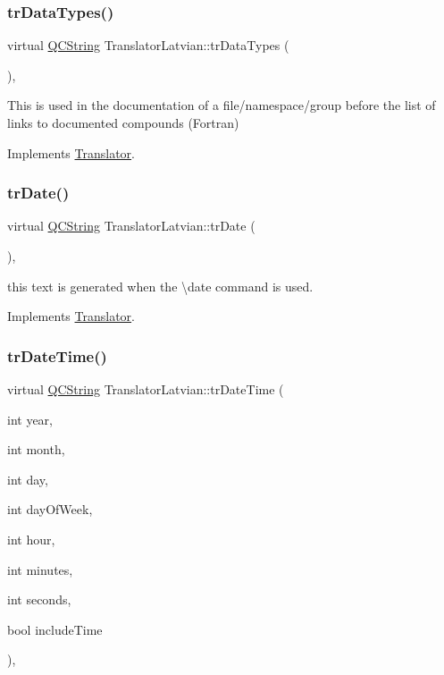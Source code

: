 \subsubsection{\texorpdfstring{trDataTypes()}{trDataTypes()}}
{\footnotesize\ttfamily virtual \mbox{\hyperlink{class_q_c_string}{Q\+C\+String}} Translator\+Latvian\+::tr\+Data\+Types (\begin{DoxyParamCaption}{ }\end{DoxyParamCaption})\hspace{0.3cm}{\ttfamily [inline]}, {\ttfamily [virtual]}}

This is used in the documentation of a file/namespace/group before the list of links to documented compounds (Fortran) 

Implements \mbox{\hyperlink{class_translator}{Translator}}.

\mbox{\label{class_translator_latvian_a0c27033fbc29758948d56b104370738f}} 
\subsubsection{\texorpdfstring{trDate()}{trDate()}}
{\footnotesize\ttfamily virtual \mbox{\hyperlink{class_q_c_string}{Q\+C\+String}} Translator\+Latvian\+::tr\+Date (\begin{DoxyParamCaption}{ }\end{DoxyParamCaption})\hspace{0.3cm}{\ttfamily [inline]}, {\ttfamily [virtual]}}

this text is generated when the \textbackslash{}date command is used. 

Implements \mbox{\hyperlink{class_translator}{Translator}}.

\mbox{\label{class_translator_latvian_a0fdc35505e7beca6f241f31ed3a21f59}} 
\subsubsection{\texorpdfstring{trDateTime()}{trDateTime()}}
{\footnotesize\ttfamily virtual \mbox{\hyperlink{class_q_c_string}{Q\+C\+String}} Translator\+Latvian\+::tr\+Date\+Time (\begin{DoxyParamCaption}\item[{int}]{year,  }\item[{int}]{month,  }\item[{int}]{day,  }\item[{int}]{day\+Of\+Week,  }\item[{int}]{hour,  }\item[{int}]{minutes,  }\item[{int}]{seconds,  }\item[{bool}]{include\+Time }\end{DoxyParamCaption})\hspace{0.3cm}{\ttfamily [inline]}, {\ttfamily [virtual]}}

